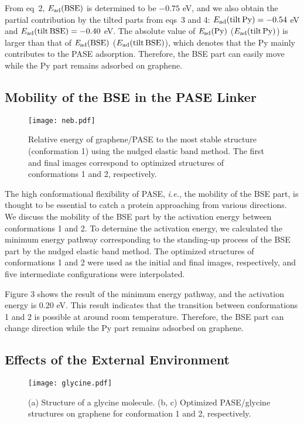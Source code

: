 \documentclass[journal=acsodf,manuscript=article]{achemso}
\begin{document}
From eq\ 2, $E_{\rm ad}(\rm BSE)$ is determined to be $-0.75$ eV, and we also obtain the partial contribution by the tilted parts from eqs\ 3 and 4: $E_{\rm ad}(\rm tilt \, Py) = -0.54$ eV and $E_{\rm ad}(\rm tilt \, BSE) = -0.40$ eV. The absolute value of ${\it E}_{\rm ad}(\rm Py)$ ($E_{\rm ad}(\rm tilt \, Py)$) is larger than that of ${\it E}_{\rm ad}(\rm BSE)$ ($E_{\rm ad}(\rm tilt \, BSE)$), which denotes that the Py mainly contributes to the PASE adsorption. Therefore, the BSE part can easily move while the Py part remains adsorbed on graphene.

\subsection{Mobility of the BSE in the PASE Linker}

\begin{figure}[ht]
    \centering
     \texttt{[image: neb.pdf]}
    \caption{Relative energy of graphene/PASE to the most stable structure (conformation 1) using the nudged elastic band method. The first and final images correspond to optimized structures of conformations 1 and 2, respectively.}
    \label{fig:neb}
\end{figure}

The high conformational flexibility of PASE, {\it i.e.}, the mobility of the BSE part, is thought to be essential to catch a protein approaching from various directions. We discuss the mobility of the BSE part by the activation energy between conformations 1 and 2. To determine the activation energy, we calculated the minimum energy pathway corresponding to the standing-up process of the BSE part by the nudged elastic band method\cite{henkelman2000improved}. The optimized structures of conformations 1 and 2 were used as the initial and final images, respectively, and five intermediate configurations were interpolated.

Figure 3 shows the result of the minimum energy pathway, and the activation energy is 0.20 eV. This result indicates that the transition between conformations 1 and 2 is possible at around room temperature. Therefore, the BSE part can change direction while the Py part remains adsorbed on graphene.

\subsection{Effects of the External Environment}

\begin{figure}[b]
    \centering
     \texttt{[image: glycine.pdf]}
    \caption{(a) Structure of a glycine molecule. (b, c) Optimized PASE/glycine structures on graphene for conformation 1 and 2, respectively.}
\label{fig:glycine}
\end{figure}
\end{document}
